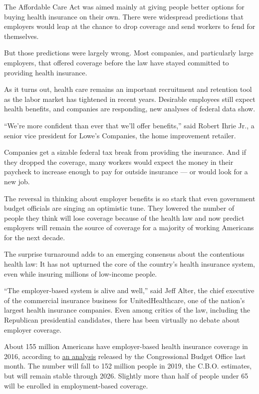 The Affordable Care Act was aimed mainly at giving people better options
for buying health insurance on their own. There were widespread
predictions that employers would leap at the chance to drop coverage and
send workers to fend for themselves.

But those predictions were largely wrong. Most companies, and
particularly large employers, that offered coverage before the law have
stayed committed to providing health insurance.

As it turns out, health care remains an important recruitment and
retention tool as the labor market has tightened in recent years.
Desirable employees still expect health benefits, and companies are
responding, new analyses of federal data show.

``We're more confident than ever that we'll offer benefits,'' said
Robert Ihrie Jr., a senior vice president for Lowe's Companies, the home
improvement retailer.

Companies get a sizable federal tax break from providing the insurance.
And if they dropped the coverage, many workers would expect the money in
their paycheck to increase enough to pay for outside insurance --- or
would look for a new job.

The reversal in thinking about employer benefits is so stark that even
government budget officials are singing an optimistic tune. They lowered
the number of people they think will lose coverage because of the health
law and now predict employers will remain the source of coverage for a
majority of working Americans for the next decade.

The surprise turnaround adds to an emerging consensus about the
contentious health law: It has not upturned the core of the country's
health insurance system, even while insuring millions of low-income
people.

``The employer-based system is alive and well,'' said Jeff Alter, the
chief executive of the commercial insurance business for
UnitedHealthcare, one of the nation's largest health insurance
companies. Even among critics of the law, including the Republican
presidential candidates, there has been virtually no debate about
employer coverage.

About 155 million Americans have employer-based health insurance
coverage in 2016, according to
\href{https://www.cbo.gov/sites/default/files/114th-congress-2015-2016/reports/51385-HealthInsuranceBaseline_OneCol.pdf}{an
analysis} released by the Congressional Budget Office last month. The
number will fall to 152 million people in 2019, the C.B.O. estimates,
but will remain stable through 2026. Slightly more than half of people
under 65 will be enrolled in employment-based coverage.

